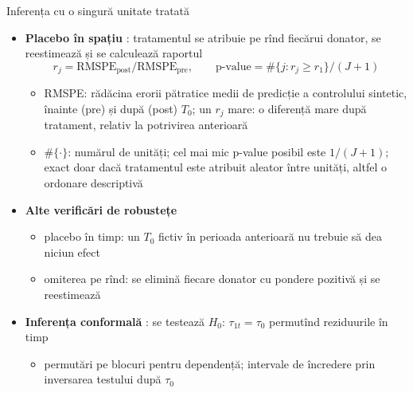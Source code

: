 \begin{frame}{Inferența cu o singură unitate tratată}
\itemsize{\small}
\begin{itemize}
    \item \textbf{Placebo în spațiu} : tratamentul se atribuie pe rînd fiecărui donator, se reestimează și se calculează raportul \[ r_j = \mathrm{RMSPE}_{\mathrm{post}}/\mathrm{RMSPE}_{\mathrm{pre}}, \qquad \text{p-value} = \#\{j: r_j \ge r_1\}/(J + 1) \]
    \begin{itemize}
        \item RMSPE: rădăcina erorii pătratice medii de predicție a controlului sintetic, înainte (pre) și după (post) $T_0$; un $r_j$ mare: o diferență mare după tratament, relativ la potrivirea anterioară
        \item $\#\{\cdot\}$: numărul de unități; cel mai mic p-value posibil este $1/(J + 1)$; exact doar dacă tratamentul este atribuit aleator între unități, altfel o ordonare descriptivă 
    \end{itemize}
    \item \textbf{Alte verificări de robustețe}
    \begin{itemize}
        \item placebo în timp: un $T_0$ fictiv în perioada anterioară nu trebuie să dea niciun efect
        \item omiterea pe rînd: se elimină fiecare donator cu pondere pozitivă și se reestimează
    \end{itemize}
    \item \textbf{Inferența conformală} : se testează $H_0$: $\tau_{1t} = \tau_0$ permutînd reziduurile în timp
    \begin{itemize}
        \item permutări pe blocuri pentru dependență; intervale de încredere prin inversarea testului după $\tau_0$
    \end{itemize}
\end{itemize}
\end{frame}

